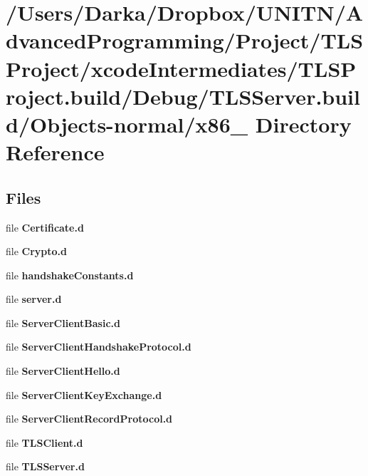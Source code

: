 \section{/\+Users/\+Darka/\+Dropbox/\+U\+N\+I\+T\+N/\+Advanced\+Programming/\+Project/\+T\+L\+S\+Project/xcode\+Intermediates/\+T\+L\+S\+Project.build/\+Debug/\+T\+L\+S\+Server.build/\+Objects-\/normal/x86\+\_ Directory Reference}
\label{dir_24ec6fc019b7fbce1f829e9a96b023f9}
\subsection*{Files}
\begin{DoxyCompactItemize}
\item 
file {\bf Certificate.\+d}
\item 
file {\bf Crypto.\+d}
\item 
file {\bf handshake\+Constants.\+d}
\item 
file {\bf server.\+d}
\item 
file {\bf Server\+Client\+Basic.\+d}
\item 
file {\bf Server\+Client\+Handshake\+Protocol.\+d}
\item 
file {\bf Server\+Client\+Hello.\+d}
\item 
file {\bf Server\+Client\+Key\+Exchange.\+d}
\item 
file {\bf Server\+Client\+Record\+Protocol.\+d}
\item 
file {\bf T\+L\+S\+Client.\+d}
\item 
file {\bf T\+L\+S\+Server.\+d}
\end{DoxyCompactItemize}
